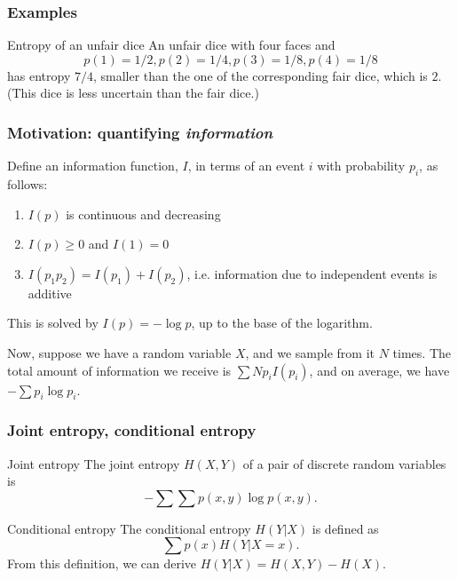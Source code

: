 \documentclass{beamer}
\begin{document}
\begin{frame}
  \frametitle{Examples}
  \begin{exampleblock}{Entropy of an unfair dice}
    An unfair dice with four faces and \[ p(1) = 1/2, p(2) = 1/4, p(3) = 1/8, p(4) = 1/8 \] has entropy $7/4$, smaller than the one of the corresponding fair dice, which is $2$. (This dice is less uncertain than the fair dice.)
  \end{exampleblock}
\end{frame}

\begin{frame}
  \frametitle{Motivation: quantifying \emph{information}}
  Define an information function, $I$, in terms of an event $i$ with probability $p_i$, as follows: \pause
  \begin{enumerate}
    \item $I(p)$ is continuous and decreasing \pause
    \item $I(p) \ge 0$ and $I(1) = 0$ \pause
    \item $I(p_1p_2) = I(p_1) + I(p_2)$, i.e. information due to independent events is additive \pause
  \end{enumerate}
  This is solved by $I(p) = - \log p$, up to the base of the logarithm. \pause

  Now, suppose we have a random variable $X$, and we sample from it $N$ times. The total amount of information we receive is $\sum N p_i I(p_i)$, and on average, we have $- \sum p_i \log p_i$.
\end{frame}

\begin{frame}
  \frametitle{Joint entropy, conditional entropy}
  \begin{block}{Joint entropy}
    The joint entropy $H(X, Y)$ of a pair of discrete random variables is \[ - \sum \sum p(x, y) \log p(x, y). \]
  \end{block} \pause

  \begin{block}{Conditional entropy}
    The conditional entropy $H(Y|X)$ is defined as \[ \sum p(x) H(Y | X = x). \] \pause
    From this definition, we can derive $H(Y|X) = H(X, Y) - H(X)$.
  \end{block}
\end{frame}
\end{document}
